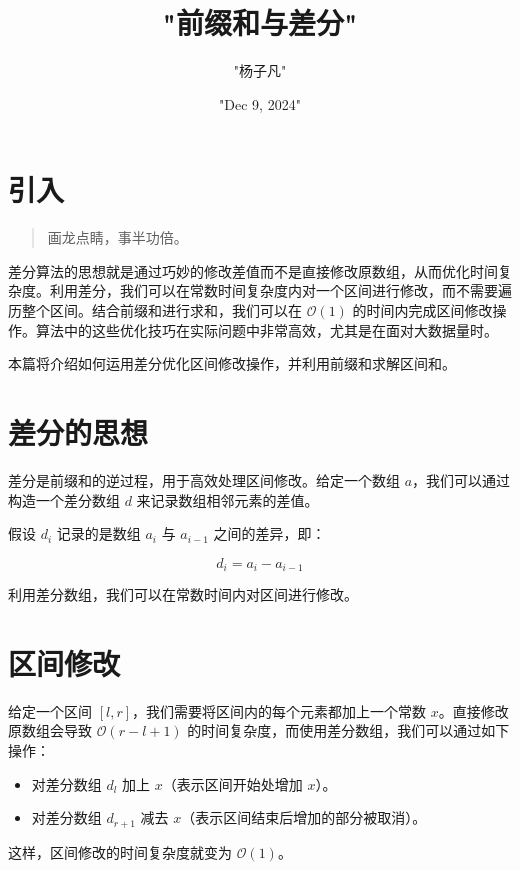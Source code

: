 \title{"前缀和与差分"}
\author{"杨子凡"}
\date{"Dec 9, 2024"}
\maketitle
\chapter{引入}
\begin{quote}
画龙点睛，事半功倍。\par
\end{quote}
差分算法的思想就是通过巧妙的修改差值而不是直接修改原数组，从而优化时间复杂度。利用差分，我们可以在常数时间复杂度内对一个区间进行修改，而不需要遍历整个区间。结合前缀和进行求和，我们可以在 $\mathcal{O}(1)$ 的时间内完成区间修改操作。算法中的这些优化技巧在实际问题中非常高效，尤其是在面对大数据量时。\par
本篇将介绍如何运用差分优化区间修改操作，并利用前缀和求解区间和。\par
\chapter{差分的思想}
差分是前缀和的逆过程，用于高效处理区间修改。给定一个数组 $a$，我们可以通过构造一个差分数组 $d$ 来记录数组相邻元素的差值。\par
假设 $d_i$ 记录的是数组 $a_i$ 与 $a_{i-1}$ 之间的差异，即：\par
$$d_i=a_i-a_{i-1}$$\par
利用差分数组，我们可以在常数时间内对区间进行修改。\par
\chapter{区间修改}
给定一个区间 $[l, r]$，我们需要将区间内的每个元素都加上一个常数 $x$。直接修改原数组会导致 $\mathcal{O}(r-l+1)$ 的时间复杂度，而使用差分数组，我们可以通过如下操作：\par
\begin{itemize}
\item 对差分数组 $d_l$ 加上 $x$（表示区间开始处增加 $x$）。
\item 对差分数组 $d_{r+1}$ 减去 $x$（表示区间结束后增加的部分被取消）。
\end{itemize}
这样，区间修改的时间复杂度就变为 $\mathcal{O}(1)$。\par
